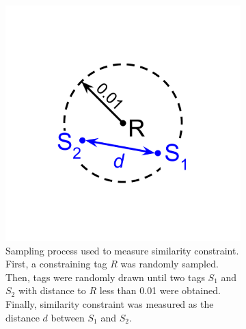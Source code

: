 \begin{figure}[!htbp]
\begin{center}

\begin{minipage}{\linewidth}
\begin{subfigure}[b]{\linewidth}
\begin{minipage}{0.5\textwidth}
\begin{center}
\includegraphics[width=0.5\linewidth,trim=5cm 5cm 5cm 5cm, clip]{img/dimensionality-statistic}
\end{center}
\end{minipage}%
\begin{minipage}{0.5\textwidth}
\caption{
Sampling process used to measure similarity constraint.
First, a constraining tag $R$ was randomly sampled.
Then, tags were randomly drawn until two tags $S_1$ and $S_2$ with distance to $R$ less than 0.01 were obtained.
Finally, similarity constraint was measured as the distance $d$ between $S_1$ and $S_2$.
}
\label{fig:dimensionality_measure}
\end{minipage}
\end{subfigure}
\end{minipage}
\begin{subfigure}[b]{\linewidth}
\begin{minipage}{0.6\linewidth}

\end{minipage}
\end{subfigure}
\end{center}
\end{figure}
